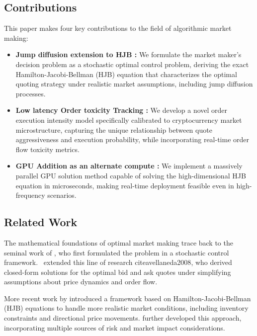\documentclass[twocolumn,ieee]{arithmaxresearch}
\begin{document}
\subsection{Contributions}

This paper makes four key contributions to the field of algorithmic market making:

\begin{itemize}
    \item \textbf {Jump diffusion extension to HJB : } We formulate the market maker's decision problem as a stochastic optimal control problem, deriving the exact Hamilton-Jacobi-Bellman (HJB) equation that characterizes the optimal quoting strategy under realistic market assumptions, including jump diffusion processes.
    
    \item \textbf{Low latency Order toxicity Tracking : } We develop a novel order execution intensity model specifically calibrated to cryptocurrency market microstructure, capturing the unique relationship between quote aggressiveness and execution probability, while incorporating real-time order flow toxicity metrics.
    
    \item \textbf{ GPU Addition as an alternate compute : }We implement a massively parallel GPU solution method capable of solving the high-dimensional HJB equation in microseconds, making real-time deployment feasible even in high-frequency scenarios.
    
\end{itemize}

\subsection {Related Work}

The mathematical foundations of optimal market making trace back to the seminal work of \cite{ho1981optimal}, who first formulated the problem in a stochastic control framework. \ extended this line of research cite{avellaneda2008}, who derived closed-form solutions for the optimal bid and ask quotes under simplifying assumptions about price dynamics and order flow.

More recent work by \cite{gueant2013} introduced a framework based on Hamilton-Jacobi-Bellman (HJB) equations to handle more realistic market conditions, including inventory constraints and directional price movements. \cite{cartea2015} further developed this approach, incorporating multiple sources of risk and market impact considerations.
\end{document}
